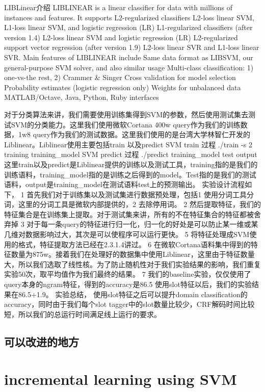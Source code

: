 \documentclass[master]{njuthesis}
\begin{document}
LIBLinear介绍
LIBLINEAR is a linear classifier for data with millions of instances and features. It supports
L2-regularized classifiers 
L2-loss linear SVM, L1-loss linear SVM, and logistic regression (LR)
L1-regularized classifiers (after version 1.4) 
L2-loss linear SVM and logistic regression (LR)
L2-regularized support vector regression (after version 1.9) 
L2-loss linear SVR and L1-loss linear SVR.
Main features of LIBLINEAR include
Same data format as LIBSVM, our general-purpose SVM solver, and also similar usage
Multi-class classification: 1) one-vs-the rest, 2) Crammer \& Singer
Cross validation for model selection
Probability estimates (logistic regression only)
Weights for unbalanced data
MATLAB/Octave, Java, Python, Ruby interfaces

对于分类算法来讲，我们需要使用训练集得到SVM的参数，然后使用测试集去测试SVM的分类能力。这里我们使用微软Cortana 400w query作为我们的训练数据，1w8 query作为我们的测试数据。这里我们使用的是台湾大学林智仁开发的Liblinear。Liblinear使用主要包括train 以及predict
SVM train 过程
./train -s 2 training training\_model
SVM predict 过程
./predict training\_model test output
这里train以及predict是Liblinear提供的训练以及测试工具，training指的是我们的训练语料，training\_model指的是训练之后得到的model。Test指的是我们的测试语料，output是training\_model在测试语料test上的预测输出。
实验设计流程如下，
1 首先我们对于训练集以及测试集进行数据预处理，包括1 使用分词工具分词，这里的分词工具是微软内部提供的，2 去除停用词。
2 然后提取特征，我们的特征集合是在训练集上提取。对于测试集来讲，所有的不在特征集合的特征都被舍弃掉
3 对于每一条query的特征进行归一化，归一化的好处是可以防止某一维或某几维对数据影响过大，其次是可以使程序可以运行更快。
5 将特征处理成SVM使用的格式，特征提取方法已经在2.3.1.4讲过。
6 在微软Cortana语料集中得到的特征数量为875w。接着我们在处理好的数据集中使用Liblinear，这里由于特征数量大，所以我们选取了线性核。为了防止随机性对于我们实验结果的影响，我们重复实验50次，取平均值作为我们最终的结果。
7 我们的baseline实验，仅仅使用了query本身的ngram特征，得到的accuracy是86.5
使用slot特征以后，我们的实验结果在86.5+1.9。
实验总结，
使用slot特征之后可以提升domain classification的accuracy，同时由于我们每个slot tagger中的slot数量比较少，CRF解码时间比较短，所以我们的总运行时间满足线上运行的要求。

\section{可以改进的地方}


\chapter{incremental learning using SVM}\label{chapter_smallworld}
\end{document}
